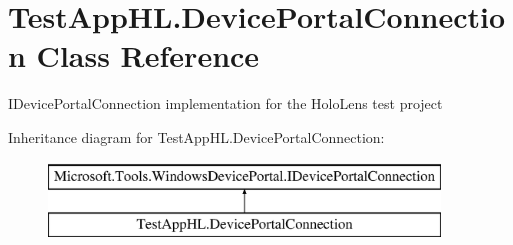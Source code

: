 \hypertarget{class_test_app_h_l_1_1_device_portal_connection}{}\section{Test\+App\+H\+L.\+Device\+Portal\+Connection Class Reference}
\label{class_test_app_h_l_1_1_device_portal_connection}


I\+Device\+Portal\+Connection implementation for the Holo\+Lens test project  


Inheritance diagram for Test\+App\+H\+L.\+Device\+Portal\+Connection\+:\begin{figure}[H]
\begin{center}
\leavevmode
\includegraphics[height=2.000000cm]{class_test_app_h_l_1_1_device_portal_connection}
\end{center}
\end{figure}
